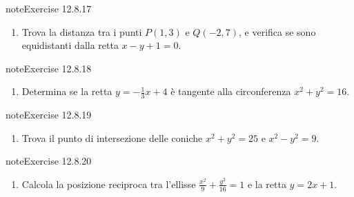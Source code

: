 \documentclass[letterpaper,10pt,italian]{jupyterBook}
\begin{document}
\begin{sphinxadmonition}{note}{Exercise 12.8.17}


\begin{enumerate}
%
\setcounter{enumi}{16}
\item {} 
\sphinxAtStartPar
Trova la distanza tra i punti \( P(1, 3) \) e \( Q(-2, 7) \), e verifica se sono equidistanti dalla retta \( x - y + 1 = 0 \).

\end{enumerate}
\end{sphinxadmonition}
 \label{exercise:ch/analytic_geometry/analytic_geometry_2d/sol-exercise-17}

\begin{sphinxadmonition}{note}{Exercise 12.8.18}


\begin{enumerate}
%
\setcounter{enumi}{17}
\item {} 
\sphinxAtStartPar
Determina se la retta \( y = -\frac{1}{3}x + 4 \) è tangente alla circonferenza \( x^2 + y^2 = 16 \).

\end{enumerate}
\end{sphinxadmonition}
 \label{exercise:ch/analytic_geometry/analytic_geometry_2d/sol-exercise-18}

\begin{sphinxadmonition}{note}{Exercise 12.8.19}


\begin{enumerate}
%
\setcounter{enumi}{18}
\item {} 
\sphinxAtStartPar
Trova il punto di intersezione delle coniche \( x^2 + y^2 = 25 \) e \( x^2 - y^2 = 9 \).

\end{enumerate}
\end{sphinxadmonition}
 \label{exercise:ch/analytic_geometry/analytic_geometry_2d/sol-exercise-19}

\begin{sphinxadmonition}{note}{Exercise 12.8.20}


\begin{enumerate}
%
\setcounter{enumi}{19}
\item {} 
\sphinxAtStartPar
Calcola la posizione reciproca tra l’ellisse \( \frac{x^2}{9} + \frac{y^2}{16} = 1 \) e la retta \( y = 2x + 1 \).

\end{enumerate}
\end{sphinxadmonition}
\end{document}
